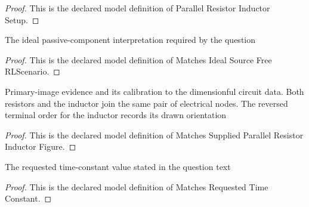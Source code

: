\begin{proof}
  This is the declared model definition of Parallel Resistor Inductor Setup.
\end{proof}
\begin{definition}
  \label{def:physics:phyx-mini-0928:phyxminiproblems-problemphyxmini0928-matchesidealsourcefreerlscenario}
  The ideal passive-component interpretation required by the question
\end{definition}
\begin{proof}
  This is the declared model definition of Matches Ideal Source Free RLScenario.
\end{proof}
\begin{definition}
  \label{def:physics:phyx-mini-0928:phyxminiproblems-problemphyxmini0928-matchessuppliedparallelresistorinductorfigure}
  Primary-image evidence and its calibration to the dimensionful circuit data. Both resistors and the inductor join the same pair of electrical nodes. The reversed terminal order for the inductor records its drawn orientation
\end{definition}
\begin{proof}
  This is the declared model definition of Matches Supplied Parallel Resistor Inductor Figure.
\end{proof}
\begin{definition}
  \label{def:physics:phyx-mini-0928:phyxminiproblems-problemphyxmini0928-matchesrequestedtimeconstant}
  The requested time-constant value stated in the question text
\end{definition}
\begin{proof}
  This is the declared model definition of Matches Requested Time Constant.
\end{proof}
